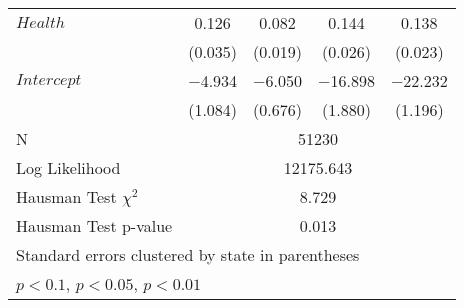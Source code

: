 {\begin{longtable}{l*{4}{c}}
  $\mathit{Health}$& 0.126\sym{***}& 0.082\sym{***}& 0.144\sym{***}& 0.138\sym{***}\\
  & (0.035) & (0.019) & (0.026) & (0.023) \\
  $\mathit{Intercept}$& $-$4.934\sym{***}& $-$6.050\sym{***}& $-$16.898\sym{***}& $-$22.232\sym{***}\\
  & (1.084) & (0.676) & (1.880) & (1.196) \\
  \midrule
  N & \multicolumn{4}{c}{51230} \\
  Log Likelihood& \multicolumn{4}{c}{12175.643} \\
  Hausman Test $\chi^2$ & \multicolumn{4}{c}{8.729} \\
  Hausman Test p-value & \multicolumn{4}{c}{0.013} \\
  \bottomrule
  \multicolumn{5}{l}{\tiny Standard errors clustered by state in parentheses}\\
  \multicolumn{5}{l}{\tiny \sym{*} \(p<0.1\), \sym{**} \(p<0.05\), \sym{***} \(p<0.01\)}\\
\end{longtable}
}
